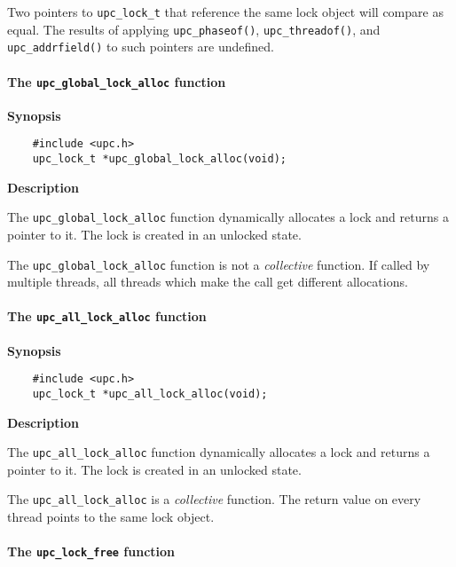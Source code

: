 \np Two pointers to {\tt upc\_lock\_t} that reference the same lock object will
    compare as equal.  The results of applying {\tt upc\_phaseof()},
     {\tt upc\_threadof()}, and {\tt upc\_addrfield()} to such pointers
     are undefined.
\paragraph{The {\tt upc\_global\_lock\_alloc} function}

{\bf Synopsis} 

\npf\vspace{-2.5em}
\begin{verbatim}
    #include <upc.h> 
    upc_lock_t *upc_global_lock_alloc(void); 
\end{verbatim}

{\bf Description}

\np The {\tt upc\_global\_lock\_alloc} function dynamically
    allocates a lock and returns a pointer to it.  The lock is created
    in an unlocked state.

\np The {\tt upc\_global\_lock\_alloc} function is not a {\em
    collective} function. If called by multiple threads,
    all threads which make the call get different allocations.
    
\paragraph{The {\tt upc\_all\_lock\_alloc} function}

{\bf Synopsis} 

\npf\vspace{-2.5em}
\begin{verbatim}
    #include <upc.h> 
    upc_lock_t *upc_all_lock_alloc(void); 
\end{verbatim}

{\bf Description}

\np The {\tt upc\_all\_lock\_alloc} function dynamically
    allocates a lock and returns a pointer to it. The lock is created
    in an unlocked state.

\np The {\tt upc\_all\_lock\_alloc} is a {\em collective}
    function.  The return value on every thread points to the same
    lock object.

\paragraph{The {\tt upc\_lock\_free} function}

